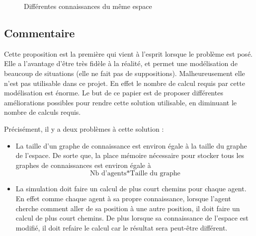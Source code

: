 \documentclass[a4paper]{article}
\begin{document}
\begin{figure}
  \caption{Différentes connaissances du même espace}
  \centering
  \label{fig:connaissance}
\end{figure}

  \subsection{Commentaire}

Cette proposition est la première qui vient à l'esprit lorsque le problème est
posé. Elle a l'avantage d'être très fidèle à la réalité, et permet une
modélisation de beaucoup de situations (elle ne fait pas de suppositions).
Malheureusement elle n'est pas utilisable dans ce projet. En effet le nombre de
calcul requis par cette modélisation est énorme. Le but de ce papier est de
proposer différentes améliorations possibles pour rendre cette solution
utilisable, en diminuant le nombre de calculs requis.

Précisément, il y a deux problèmes à cette solution :

\begin{itemize}
  \item

La taille d'un graphe de connaissance est environ égale à la taille du
graphe de l'espace. De sorte que, la place mémoire nécessaire pour stocker
tous les graphes de connaissances est environ égale à \[\text{Nb d'agents} *
\text{Taille du graphe}\]

  \item

La simulation doit faire un calcul de plus court chemins pour chaque
agent. En effet comme chaque agent à sa propre connaissance, lorsque l'agent
cherche comment aller de sa position à une autre position, il doit faire un
calcul de plus court chemins. De plus lorsque sa connaissance de l'espace
est modifié, il doit refaire le calcul car le résultat sera peut-être
différent.

\end{itemize}
\end{document}
